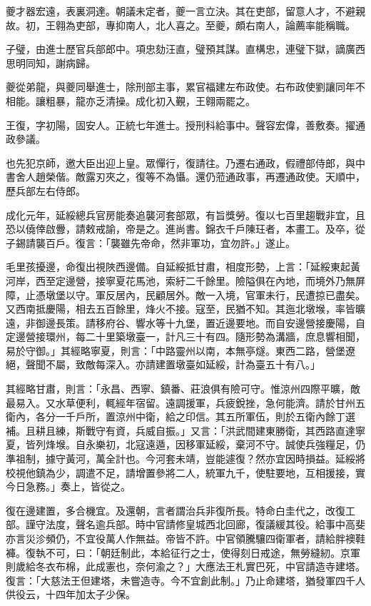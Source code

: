 \begin{pinyinscope}
夔才器宏遠，表裏洞達。朝議未定者，夔一言立決。其在吏部，留意人才，不避親故。初，王翱為吏部，專抑南人，北人喜之。至夔，頗右南人，論薦率能稱職。

子璧，由進士歷官兵部郎中。項忠劾汪直，璧預其謀。直構忠，連璧下獄，謫廣西思明同知，謝病歸。

夔從弟龍，與夔同舉進士，除刑部主事，累官福建左布政使。右布政使劉讓同年不相能。讓粗暴，龍亦乏清操。成化初入覲，王翱兩罷之。

王復，字初陽，固安人。正統七年進士。授刑科給事中。聲容宏偉，善敷奏。擢通政參議。

也先犯京師，邀大臣出迎上皇。眾憚行，復請往。乃遷右通政，假禮部侍郎，與中書舍人趙榮偕。敵露刃夾之，復等不為懾。還仍蒞通政事，再遷通政使。天順中，歷兵部左右侍郎。

成化元年，延綏總兵官房能奏追襲河套部眾，有旨獎勞。復以七百里趨戰非宜，且恐以僥倖啟釁，請敕戒諭，帝是之。進尚書。錦衣千戶陳玨者，本畫工。及卒，從子錫請襲百戶。復言：「襲雖先帝命，然非軍功，宜勿許。」遂止。

毛里孩擾邊，命復出視陜西邊備。自延綏抵甘肅，相度形勢，上言：「延綏東起黃河岸，西至定邊營，接寧夏花馬池，索紆二千餘里。險隘俱在內地，而境外乃無屏障，止憑墩堡以守。軍反居內，民顧居外。敵一入境，官軍未行，民遭掠已盡矣。又西南抵慶陽，相去五百餘里，烽火不接。寇至，民猶不知。其迤北墩堠，率皆曠遠，非御邊長策。請移府谷、響水等十九堡，置近邊要地。而自安邊營接慶陽，自定邊營接環州，每二十里築墩臺一，計凡三十有四。隨形勢為溝牆，庶息響相聞，易於守御。」其經略寧夏，則言：「中路靈州以南，本無亭燧。東西二路，營堡遼絕，聲聞不屬，致敵每深入。亦請建置墩臺如延綏，計為臺五十有八。」

其經略甘肅，則言：「永昌、西寧、鎮番、莊浪俱有險可守。惟涼州四際平曠，敵最易入。又水草便利，輒經年宿留。遠調援軍，兵疲銳挫，急何能濟。請於甘州五衛內，各分一千戶所，置涼州中衛，給之印信。其五所軍伍，則於五衛內餘丁選補。且耕且練，斯戰守有資，兵威自振。」又言：「洪武間建東勝衛，其西路直達寧夏，皆列烽堠。自永樂初，北寇遠遁，因移軍延綏，棄河不守。誠使兵強糧足，仍準祖制，據守黃河，萬全計也。今河套未靖，豈能遽復？然亦宜因時損益。延綏將校視他鎮為少，調遣不足，請增置參將二人，統軍九千，使駐要地，互相援接，實今日急務。」奏上，皆從之。

復在邊建置，多合機宜。及還朝，言者謂治兵非復所長。特命白圭代之，改復工部。謹守法度，聲名逾兵部。時中官請修皇城西北回廊，復議緩其役。給事中高斐亦言災沴頻仍，不宜役萬人作無益。帝皆不許。中官領騰驤四衛軍者，請給胖襖鞋褲。復執不可，曰：「朝廷制此，本給征行之士，使得刻日戒途，無勞縫紉。京軍則歲給冬衣布棉，此成憲也，奈何渝之？」大應法王札實巴死，中官請造寺建塔。復言：「大慈法王但建塔，未嘗造寺。今不宜創此制。」乃止命建塔，猶發軍四千人供役云，十四年加太子少保。


\end{pinyinscope}
